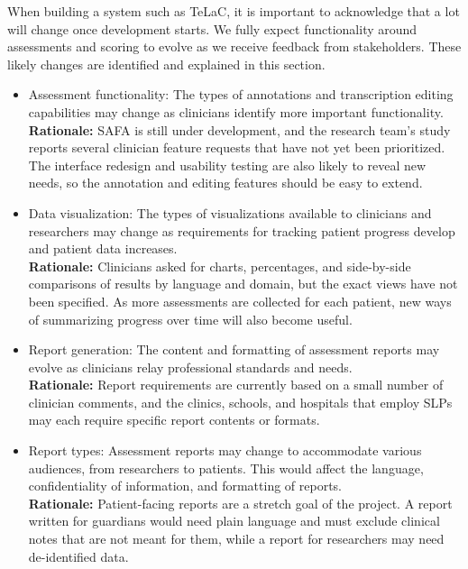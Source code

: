 \documentclass[12pt]{article}
\newcounter{lcnum} %
\begin{document}
When building a system such as TeLaC, it is important to acknowledge that a lot will change once development starts. We fully expect functionality around assessments and scoring to evolve as we receive feedback from stakeholders. These likely changes are identified and explained in this section.
\noindent \begin{itemize}

\item[\textbf{LC\refstepcounter{lcnum}\thelcnum}\label{LC_AssessmentFunctionality}:] Assessment functionality: The types of annotations and transcription editing capabilities may change as clinicians identify more important functionality.
  \\ \textbf{Rationale:} SAFA is still under development, and the research team's study reports several clinician feature requests that have not yet been prioritized. The interface redesign and usability testing are also likely to reveal new needs, so the annotation and editing features should be easy to extend.

\item[\textbf{LC\refstepcounter{lcnum}\thelcnum}\label{LC_DataVisualization}:] Data visualization: The types of visualizations available to clinicians and researchers may change as requirements for tracking patient progress develop and patient data increases.
  \\ \textbf{Rationale:} Clinicians asked for charts, percentages, and side-by-side comparisons of results by language and domain, but the exact views have not been specified. As more assessments are collected for each patient, new ways of summarizing progress over time will also become useful.

\item[\textbf{LC\refstepcounter{lcnum}\thelcnum}\label{LC_ReportGeneration}:] Report generation: The content and formatting of assessment reports may evolve as clinicians relay professional standards and needs.
  \\ \textbf{Rationale:} Report requirements are currently based on a small number of clinician comments, and the clinics, schools, and hospitals that employ SLPs may each require specific report contents or formats.

\item[\textbf{LC\refstepcounter{lcnum}\thelcnum}\label{LC_ReportTypes}:] Report types: Assessment reports may change to accommodate various audiences, from researchers to patients. This would affect the language, confidentiality of information, and formatting of reports.
  \\ \textbf{Rationale:} Patient-facing reports are a stretch goal of the project. A report written for guardians would need plain language and must exclude clinical notes that are not meant for them, while a report for researchers may need de-identified data.

\end{itemize}
\end{document}
